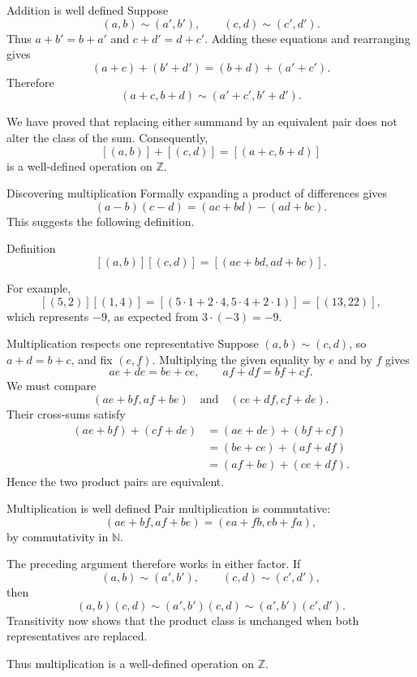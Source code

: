 \documentclass[aspectratio=169,11pt]{beamer}
\newcommand{\N}{\mathbb N}
\newcommand{\Z}{\mathbb Z}
\newcommand{\cl}[2]{\left[(#1,#2)\right]}
\begin{document}
\begin{frame}{Addition is well defined}
  \small
  Suppose
  \[
    (a,b)\sim(a',b'),
    \qquad
    (c,d)\sim(c',d').
  \]
  Thus \(a+b'=b+a'\) and \(c+d'=d+c'\).  Adding these equations and
  rearranging gives
  \[
    (a+c)+(b'+d')=(b+d)+(a'+c').
  \]
  Therefore
  \[
    (a+c,b+d)\sim(a'+c',b'+d').
  \]

  We have proved that replacing either summand by an equivalent pair does not
  alter the class of the sum.  Consequently,
  \[
    \cl{a}{b}+\cl{c}{d}=\cl{a+c}{b+d}
  \]
  is a well-defined operation on \(\Z\).
\end{frame}

\begin{frame}{Discovering multiplication}
  Formally expanding a product of differences gives
  \[
    (a-b)(c-d)=(ac+bd)-(ad+bc).
  \]
  This suggests the following definition.

  \begin{block}{Definition}
    \[
      \boxed{
      \cl{a}{b}\cl{c}{d}
        =\cl{ac+bd}{ad+bc}.}
    \]
  \end{block}

  For example,
  \[
    \cl{5}{2}\cl{1}{4}
      =\cl{5\cdot1+2\cdot4}{5\cdot4+2\cdot1}
      =\cl{13}{22},
  \]
  which represents \(-9\), as expected from \(3\cdot(-3)=-9\).
\end{frame}

\begin{frame}{Multiplication respects one representative}
  \footnotesize
  Suppose \((a,b)\sim(c,d)\), so \(a+d=b+c\), and fix \((e,f)\).
  Multiplying the given equality by \(e\) and by \(f\) gives
  \[
    ae+de=be+ce,
    \qquad
    af+df=bf+cf.
  \]
  We must compare
  \[
    (ae+bf,af+be)
    \quad\text{and}\quad
    (ce+df,cf+de).
  \]
  Their cross-sums satisfy
  \begin{align*}
    (ae+bf)+(cf+de)
      &=(ae+de)+(bf+cf)\\
      &=(be+ce)+(af+df)\\
      &=(af+be)+(ce+df).
  \end{align*}
  Hence the two product pairs are equivalent.
\end{frame}

\begin{frame}{Multiplication is well defined}
  Pair multiplication is commutative:
  \[
    (ae+bf,af+be)=(ea+fb,eb+fa),
  \]
  by commutativity in \(\N\).

  The preceding argument therefore works in either factor.  If
  \[
    (a,b)\sim(a',b'),
    \qquad
    (c,d)\sim(c',d'),
  \]
  then
  \[
    (a,b)(c,d)\sim(a',b')(c,d)
      \sim(a',b')(c',d').
  \]
  Transitivity now shows that the product class is unchanged when both
  representatives are replaced.

  Thus multiplication is a well-defined operation on \(\Z\).
\end{frame}
\end{document}
